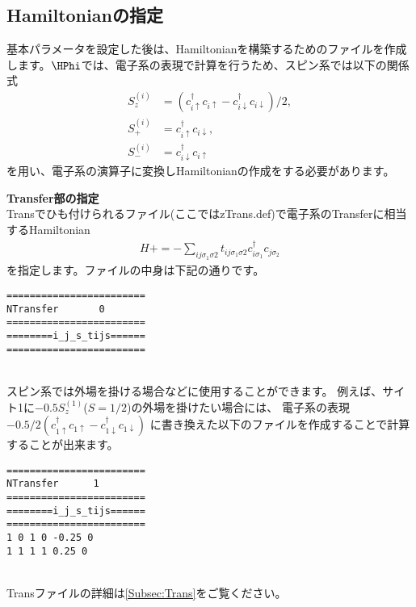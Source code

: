 \subsection{Hamiltonianの指定}
基本パラメータを設定した後は、Hamiltonianを構築するためのファイルを作成します。$\HPhi$では、電子系の表現で計算を行うため、スピン系では以下の関係式
\begin{align}
S_z^{(i)}&=(c_{i\uparrow}^{\dag}c_{i\uparrow}-c_{i\downarrow}^{\dag}c_{i\downarrow})/2,\\
S_+^{(i)}&=c_{i\uparrow}^{\dag}c_{i\downarrow},\\
S_-^{(i)}&=c_{i\downarrow}^{\dag}c_{i\uparrow}
\end{align}
を用い、電子系の演算子に変換しHamiltonianの作成をする必要があります。
\begin{description}
\item {\bf Transfer部の指定}\\
Transでひも付けられるファイル(ここではzTrans.def)で電子系のTransferに相当するHamiltonian
\begin{align}
H +=-\sum_{ij\sigma_1\sigma2} t_{ij\sigma_1\sigma2}c_{i\sigma_1}^{\dag}c_{j\sigma_2}
\end{align}
を指定します。ファイルの中身は下記の通りです。\\
\begin{minipage}{15cm}
\begin{screen}
\begin{verbatim}
======================== 
NTransfer       0  
======================== 
========i_j_s_tijs====== 
======================== 
\end{verbatim}
\end{screen}
\end{minipage}
~\\
スピン系では外場を掛ける場合などに使用することができます。
例えば、サイト1に$-0.5 S_z^{(1)}${($S=1/2$)}の外場を掛けたい場合には、
電子系の表現$-0.5/2(c_{1\uparrow}^{\dag}c_{1\uparrow}-c_{1\downarrow}^{\dag}c_{1\downarrow})$
に書き換えた以下のファイルを作成することで計算することが出来ます。\\
\begin{minipage}{15cm}
\begin{screen}
\begin{verbatim}
======================== 
NTransfer      1   
======================== 
========i_j_s_tijs====== 
======================== 
1 0 1 0 -0.25 0
1 1 1 1 0.25 0
\end{verbatim}
\end{screen}
\end{minipage}
~\\
Transファイルの詳細は\ref{Subsec:Trans}をご覧ください。


\end{description}
